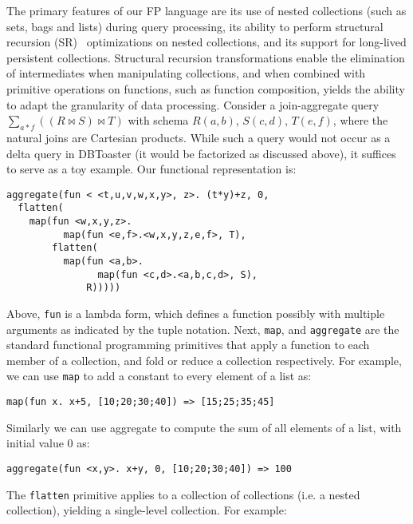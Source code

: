 The primary features of our FP language are its use of nested collections (such
as sets, bags and lists) during query processing, its ability to perform
structural recursion (SR)~\cite{buneman-kleisli:95} optimizations on nested
collections, and its support for long-lived persistent collections. Structural
recursion transformations enable the elimination of intermediates when
manipulating collections, and when combined with primitive operations on
functions, such as function composition, yields the ability to adapt the
granularity of data processing. Consider a join-aggregate query
$\sum_{a*f}((R \bowtie S) \bowtie T)$ with schema
$R(a,b)$, $S(c,d)$, $T(e,f)$, where the natural joins are Cartesian
products. While such a query would not occur as a delta query in DBToaster
(it would be factorized as discussed above), it suffices to serve as a
toy example. Our functional representation is:

\begin{verbatim}
aggregate(fun < <t,u,v,w,x,y>, z>. (t*y)+z, 0,
  flatten(
    map(fun <w,x,y,z>.
          map(fun <e,f>.<w,x,y,z,e,f>, T),
        flatten(
          map(fun <a,b>.
                map(fun <c,d>.<a,b,c,d>, S),
              R)))))
\end{verbatim}

\noindent Above, {\tt fun} is a lambda form, which defines a function possibly
with multiple arguments as indicated by the tuple notation. Next, {\tt map}, and
{\tt aggregate} are the standard functional programming primitives that apply a
function to each member of a collection, and fold or reduce a collection
respectively. For example, we can use {\tt map} to add a constant to every
element of a list as:

\vspace{-2mm}
\begin{verbatim}
map(fun x. x+5, [10;20;30;40]) => [15;25;35;45]
\end{verbatim}

\vspace{-2mm}
\noindent Similarly we can use aggregate to compute the sum of all elements of a
list, with initial value 0 as:

\vspace{-2mm}
\begin{verbatim}
aggregate(fun <x,y>. x+y, 0, [10;20;30;40]) => 100
\end{verbatim}

\vspace{-2mm}
\noindent The {\tt flatten} primitive applies to a
collection of collections (i.e. a nested collection), yielding a single-level
collection. For example:

